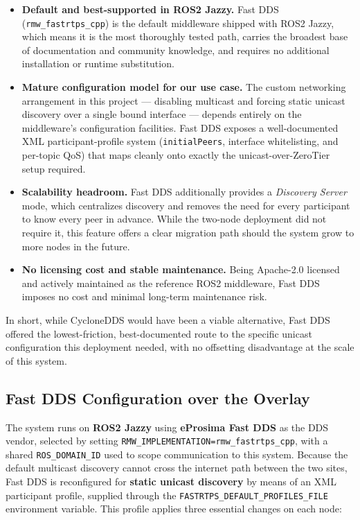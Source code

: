\begin{itemize}
    \item \textbf{Default and best-supported in ROS2 Jazzy.} Fast DDS (\texttt{rmw\_fastrtps\_cpp}) is the default middleware shipped with ROS2 Jazzy, which means it is the most thoroughly tested path, carries the broadest base of documentation and community knowledge, and requires no additional installation or runtime substitution.
    \item \textbf{Mature configuration model for our use case.} The custom networking arrangement in this project --- disabling multicast and forcing static unicast discovery over a single bound interface --- depends entirely on the middleware's configuration facilities. Fast DDS exposes a well-documented XML participant-profile system (\texttt{initialPeers}, interface whitelisting, and per-topic QoS) that maps cleanly onto exactly the unicast-over-ZeroTier setup required.
    \item \textbf{Scalability headroom.} Fast DDS additionally provides a \textit{Discovery Server} mode, which centralizes discovery and removes the need for every participant to know every peer in advance. While the two-node deployment did not require it, this feature offers a clear migration path should the system grow to more nodes in the future.
    \item \textbf{No licensing cost and stable maintenance.} Being Apache-2.0 licensed and actively maintained as the reference ROS2 middleware, Fast DDS imposes no cost and minimal long-term maintenance risk.
\end{itemize}

In short, while CycloneDDS would have been a viable alternative, Fast DDS offered the lowest-friction, best-documented route to the specific unicast configuration this deployment needed, with no offsetting disadvantage at the scale of this system.

\subsection{Fast DDS Configuration over the Overlay}

The system runs on \textbf{ROS2 Jazzy} using \textbf{eProsima Fast DDS} as the DDS vendor, selected by setting \texttt{RMW\_IMPLEMENTATION=rmw\_fastrtps\_cpp}, with a shared \texttt{ROS\_DOMAIN\_ID} used to scope communication to this system. Because the default multicast discovery cannot cross the internet path between the two sites, Fast DDS is reconfigured for \textbf{static unicast discovery} by means of an XML participant profile, supplied through the \texttt{FASTRTPS\_DEFAULT\_PROFILES\_FILE} environment variable. This profile applies three essential changes on each node:

